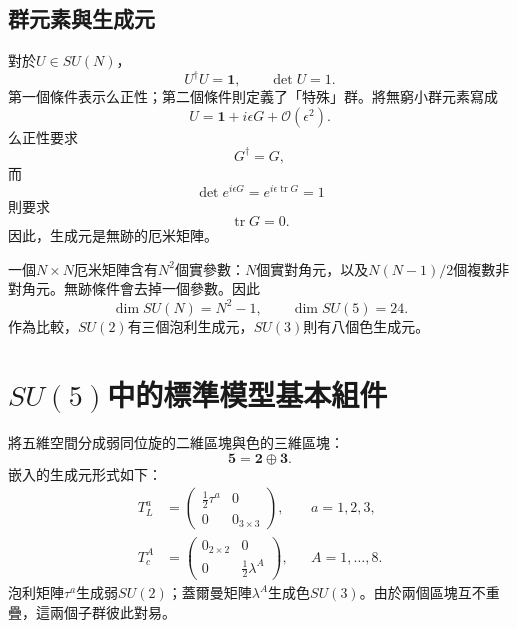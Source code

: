 \subsection{群元素與生成元}

對於\(U\in SU(N)\)，
\begin{equation}
U^\dagger U=\mathbf1,
\qquad
\det U=1.
\label{eq:l9-SUN-def}
\end{equation}
第一個條件表示么正性；第二個條件則定義了「特殊」群。將無窮小群元素寫成
\begin{equation}
U=\mathbf1+i\epsilon G+\mathcal O(\epsilon^2).
\label{eq:l9-infinitesimal-U}
\end{equation}
么正性要求
\begin{equation}
G^\dagger=G,
\end{equation}
而
\begin{equation}
\det e^{i\epsilon G}
=e^{i\epsilon\operatorname{tr}G}=1
\end{equation}
則要求
\begin{equation}
\operatorname{tr}G=0.
\end{equation}
因此，生成元是無跡的厄米矩陣。

一個\(N\times N\)厄米矩陣含有\(N^2\)個實參數：\(N\)個實對角元，以及\(N(N-1)/2\)個複數非對角元。無跡條件會去掉一個參數。因此
\begin{equation}
\dim SU(N)=N^2-1,
\qquad
\dim SU(5)=24.
\label{eq:l9-SU5-dimension}
\end{equation}
作為比較，\(SU(2)\)有三個泡利生成元，\(SU(3)\)則有八個色生成元。

\section{\texorpdfstring{\(SU(5)\)}{SU(5)}中的標準模型基本組件}

將五維空間分成弱同位旋的二維區塊與色的三維區塊：
\begin{equation}
\mathbf5=\mathbf2\oplus\mathbf3.
\end{equation}
嵌入的生成元形式如下：
\begin{align}
T^a_L
&=
\begin{pmatrix}
\tfrac12\tau^a&0\\
0&0_{3\times3}
\end{pmatrix},
&& a=1,2,3,
\label{eq:l9-SU2-block}\\
T^A_c
&=
\begin{pmatrix}
0_{2\times2}&0\\
0&\tfrac12\lambda^A
\end{pmatrix},
&& A=1,\ldots,8.
\label{eq:l9-SU3-block}
\end{align}
泡利矩陣\(\tau^a\)生成弱\(SU(2)\)；蓋爾曼矩陣\(\lambda^A\)生成色\(SU(3)\)。由於兩個區塊互不重疊，這兩個子群彼此對易。

